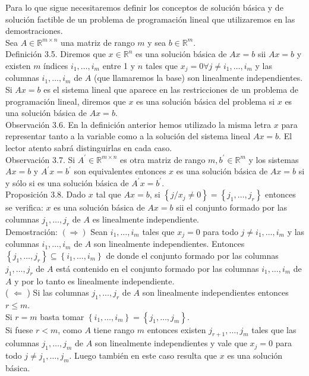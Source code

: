 \documentclass[10pt]{article}
\begin{document}
Para lo que sigue necesitaremos definir los conceptos de solución básica y de solución factible de un problema de programación lineal que utilizaremos en las demostraciones.\\
Sea $A \in \mathbb{R}^{m \times n}$ una matriz de rango $m$ y sea $b \in \mathbb{R}^{m}$.\\
Definición 3.5. Diremos que $x \in \mathbb{R}^{n}$ es una solución básica de $A x=b$ sii $A x=b$ y existen $m$ índices $i_{1}, \ldots, i_{m}$ entre 1 y $n$ tales que $x_{j}=0 \forall j \neq i_{1}, \ldots, i_{m}$ y las columnas $i_{1}, \ldots, i_{m}$ de $A$ (que llamaremos la base) son linealmente independientes. Si $A x=b$ es el sistema lineal que aparece en las restricciones de un problema de programación lineal, diremos que $x$ es una solución básica del problema si $x$ es una solución básica de $A x=b$.\\
Observación 3.6. En la definición anterior hemos utilizado la misma letra $x$ para representar tanto a la variable como a la solución del sistema lineal $A x=b$. El lector atento sabrá distinguirlas en cada caso.\\
Observación 3.7. Si $A^{\prime} \in \mathbb{R}^{m \times n}$ es otra matriz de rango $m, b^{\prime} \in \mathbb{R}^{m}$ y los sistemas $A x=b$ y $A^{\prime} x=b^{\prime}$ son equivalentes entonces $x$ es una solución básica de $A x=b$ si y sólo si es una solución básica de $A^{\prime} x=b^{\prime}$.\\
Proposición 3.8. Dado $x$ tal que $A x=b$, si $\left\{j / x_{j} \neq 0\right\}=\left\{j_{1}, \ldots, j_{r}\right\}$ entonces se verifica: $x$ es una solución básica de $A x=b$ sii el conjunto formado por las columnas $j_{1}, \ldots, j_{r}$ de $A$ es linealmente independiente.\\
Demostración: $(\Longrightarrow)$ Sean $i_{1}, \ldots, i_{m}$ tales que $x_{j}=0$ para todo $j \neq i_{1}, \ldots, i_{m}$ y las columnas $i_{1}, \ldots, i_{m}$ de $A$ son linealmente independientes. Entonces $\left\{j_{1}, \ldots, j_{r}\right\} \subseteq\left\{i_{1}, \ldots, i_{m}\right\}$ de donde el conjunto formado por las columnas $j_{1}, \ldots, j_{r}$ de $A$ está contenido en el conjunto formado por las columnas $i_{1}, \ldots, i_{m}$ de $A$ y por lo tanto es linealmente independiente.\\
( $\Longleftarrow$ ) Si las columnas $j_{1}, \ldots, j_{r}$ de $A$ son linealmente independientes entonces $r \leq m$.\\
Si $r=m$ basta tomar $\left\{i_{1}, \ldots, i_{m}\right\}=\left\{j_{1}, \ldots, j_{m}\right\}$.\\
Si fuese $r<m$, como $A$ tiene rango $m$ entonces existen $j_{r+1}, \ldots, j_{m}$ tales que las columnas $j_{1}, \ldots, j_{m}$ de $A$ son linealmente independientes y vale que $x_{j}=0$ para todo $j \neq j_{1}, \ldots, j_{m}$. Luego también en este caso resulta que $x$ es una solución básica.
\end{document}
